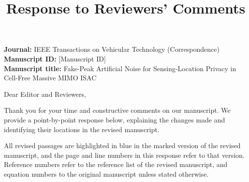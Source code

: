 \documentclass[a4paper,12pt]{article}
\newcommand{\manuscriptID}{[Manuscript ID]}
\newcommand{\manuscriptTitle}{Fake-Peak Artificial Noise for Sensing-Location Privacy in Cell-Free Massive MIMO ISAC}
\newcommand{\journalName}{IEEE Transactions on Vehicular Technology (Correspondence)}
\begin{document}
\title{\textbf{Response to Reviewers' Comments}}
\author{}
\date{}
\maketitle
\small

\textbf{Journal:} \journalName\\
\textbf{Manuscript ID:} \manuscriptID\\
\textbf{Manuscript title:} \manuscriptTitle

Dear Editor and Reviewers,

Thank you for your time and constructive comments on our manuscript.
We provide a point-by-point response below, explaining the changes made
and identifying their locations in the revised manuscript.

All revised passages are highlighted in blue in the marked version of the
revised manuscript, and the page and line numbers in this response refer to
that version. Reference numbers refer to the reference list of the revised
manuscript, and equation numbers to the original manuscript unless stated
otherwise.
\end{document}
